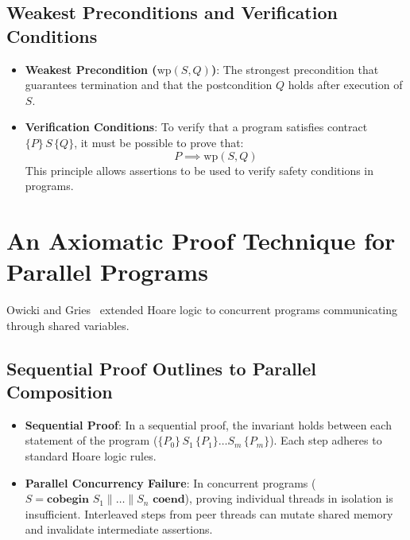 \documentclass[a4paper,12pt]{report}
\begin{document}
\subsection{Weakest Preconditions and Verification Conditions}
\begin{itemize}[itemsep=0.25em, topsep=0.15em]
    \item \textbf{Weakest Precondition ($\mathrm{wp}(S, Q)$)}: The strongest precondition that guarantees termination and that the postcondition $Q$ holds after execution of $S$.
    \item \textbf{Verification Conditions}: To verify that a program satisfies contract $\{P\}\, S \,\{Q\}$, it must be possible to prove that:
    \begin{equation}
        P \implies \mathrm{wp}(S, Q)
    \end{equation}
    This principle allows assertions to be used to verify safety conditions in programs.
\end{itemize}

\section{An Axiomatic Proof Technique for Parallel Programs}
Owicki and Gries~\cite{owicki1976axiomatic} extended Hoare logic to concurrent programs communicating through shared variables.

\subsection{Sequential Proof Outlines to Parallel Composition}
\begin{itemize}[itemsep=0.25em, topsep=0.15em]
    \item \textbf{Sequential Proof}: In a sequential proof, the invariant holds between each statement of the program ($\{P_0\}\, S_1 \,\{P_1\} \dots S_m \,\{P_m\}$). Each step adheres to standard Hoare logic rules.
    \item \textbf{Parallel Concurrency Failure}: In concurrent programs ($S = \textbf{cobegin } S_1 \parallel \dots \parallel S_n \textbf{ coend}$), proving individual threads in isolation is insufficient. Interleaved steps from peer threads can mutate shared memory and invalidate intermediate assertions.
\end{itemize}
\end{document}
